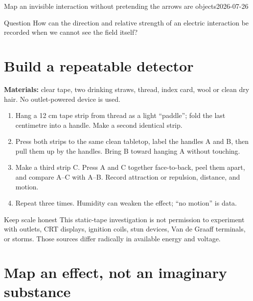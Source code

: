 

  {Map an invisible interaction without pretending the arrows are objects}{2026-07-26}


\begin{telospanel}{Question}
How can the direction and relative strength of an electric interaction be
recorded when we cannot see the field itself?
\end{telospanel}

\section{Build a repeatable detector}
\textbf{Materials:} clear tape, two drinking straws, thread, index card, wool
or clean dry hair. No outlet-powered device is used.

\begin{enumerate}
\item Hang a 12 cm tape strip from thread as a light “paddle”; fold the last
centimetre into a handle. Make a second identical strip.
\item Press both strips to the same clean tabletop, label the handles A and B,
then pull them up by the handles. Bring B toward hanging A without touching.
\item Make a third strip C. Press A and C together face-to-back, peel them apart,
and compare A--C with A--B. Record attraction or repulsion, distance, and motion.
\item Repeat three times. Humidity can weaken the effect; “no motion” is data.
\end{enumerate}

\begin{teloshazard}{Keep scale honest}
This static-tape investigation is not permission to experiment with outlets,
CRT displays, ignition coils, stun devices, Van de Graaff terminals, or storms.
Those sources differ radically in available energy and voltage. \stopline
\end{teloshazard}

\section{Map an effect, not an imaginary substance}
\begin{center}
\end{center}

